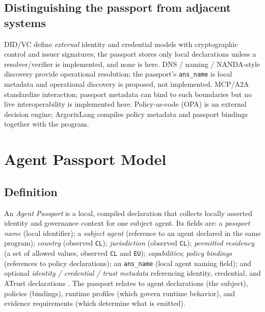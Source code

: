 \documentclass[conference]{IEEEtran}
\newcommand{\code}[1]{\texttt{\small #1}}
\newcommand{\Argorix}{%
\textcolor{argViolet}{A}\textcolor{argViolet}{r}\textcolor{argIndigo}{g}\textcolor{argIndigo}{o}\textcolor{argElectric}{r}\textcolor{argElectric}{i}\textcolor{argElectric}{x}\textcolor{argCyan}{L}\textcolor{argCyan}{a}\textcolor{argCyanBright}{n}\textcolor{argCyanBright}{g}\xspace}
\begin{document}
\subsection{Distinguishing the passport from adjacent systems}
DID/VC \cite{w3c_did_core_2022,w3c_vc_data_model_2025} define \emph{external}
identity and credential models with cryptographic control and issuer signatures;
the passport stores only local declarations unless a resolver/verifier is
implemented, and none is here. DNS / naming / NANDA-style discovery
\cite{mockapetris1987dnsconcepts,projectnanda2026,raskar2025beyonddns} provide
operational resolution; the passport's \code{ans\_name} is local metadata and
operational discovery is proposed, not implemented. MCP/A2A
\cite{mcp_spec_2025,a2a_spec} standardize interaction; passport metadata can
bind to such boundaries but no live interoperability is implemented here.
Policy-as-code (OPA) \cite{opa_docs} is an external decision engine; \Argorix
compiles policy metadata and passport bindings together with the program.

\section{Agent Passport Model}\label{sec:model}

\subsection{Definition}
An \emph{Agent Passport} is a local, compiled declaration that collects locally
asserted identity and governance context for one subject agent. Its fields are:
a \emph{passport name} (local identifier); a \emph{subject agent} (reference to
an agent declared in the same program); \emph{country} (observed \code{CL});
\emph{jurisdiction} (observed \code{CL}); \emph{permitted residency} (a set of
allowed values, observed \code{CL} and \code{EU}); \emph{capabilities};
\emph{policy bindings} (references to policy declarations); an \code{ans\_name}
(local agent naming field); and optional \emph{identity / credential / trust
metadata} referencing identity, credential, and ATrust declarations
\cite{vazquez_atrust}. The passport relates to agent declarations (the subject),
policies (bindings), runtime profiles (which govern runtime behavior), and
evidence requirements (which determine what is emitted).
\end{document}
